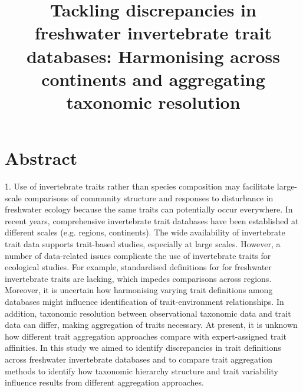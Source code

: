 \documentclass{article}
\title{Tackling discrepancies in freshwater invertebrate trait databases: Harmonising across continents and aggregating taxonomic resolution}
\author{}%
\date{}
\begin{document}
\maketitle


\section*{Abstract}




1. Use of invertebrate traits rather than species composition may facilitate large-scale comparisons of community structure and responses to disturbance in freshwater ecology because the same traits can potentially occur everywhere.  In recent years, comprehensive invertebrate trait databases have been established at different scales (e.g. regions, continents). The wide availability of invertebrate trait data supports trait-based studies, especially at large scales. However, a number of data-related issues complicate the use of invertebrate traits for ecological studies. For example, standardised definitions for for freshwater invertebrate traits are lacking, which impedes comparisons across regions. Moreover, it is uncertain how harmonising varying trait definitions among databases might influence identification of trait-environment relationships. In addition, taxonomic resolution between observational taxonomic data and trait data can differ, making aggregation of traits necessary. At present, it is unknown how different trait aggregation approaches compare with expert-assigned trait affinities. In this study we aimed to identify discrepancies in trait definitions across freshwater invertebrate databases and to compare trait aggregation methods to identify how taxonomic hierarchy structure and trait variability influence results from different aggregation approaches.
\end{document}
